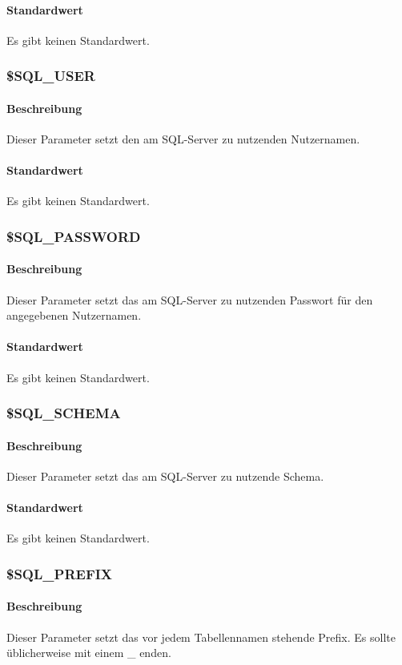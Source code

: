 \paragraph{Standardwert}Es gibt keinen Standardwert.

\subsubsection{\$SQL\_USER}
\paragraph{Beschreibung}Dieser Parameter setzt den am SQL-Server zu nutzenden Nutzernamen.
\paragraph{Standardwert}Es gibt keinen Standardwert.

\subsubsection{\$SQL\_PASSWORD}
\paragraph{Beschreibung}Dieser Parameter setzt das am SQL-Server zu nutzenden Passwort für den angegebenen Nutzernamen. 
\paragraph{Standardwert}Es gibt keinen Standardwert.

\subsubsection{\$SQL\_SCHEMA}
\paragraph{Beschreibung}Dieser Parameter setzt das am SQL-Server zu nutzende Schema.
\paragraph{Standardwert}Es gibt keinen Standardwert.

\subsubsection{\$SQL\_PREFIX}
\paragraph{Beschreibung}Dieser Parameter setzt das vor jedem Tabellennamen stehende Prefix. Es sollte üblicherweise mit einem {\glqq \_\grqq} enden.
